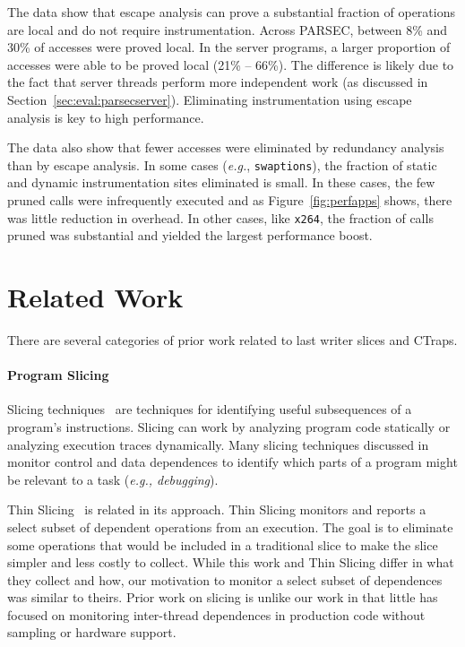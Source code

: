 \documentclass[preprint,9pt]{sigplanconf}
\newcommand{\ctraps}{CTraps\xspace}
\begin{document}
The data show that escape analysis can prove a substantial fraction of
operations are local and do not require instrumentation.  Across PARSEC,
between 8\% and 30\% of accesses were proved local.  In the server programs, a
larger proportion of accesses were able to be proved local (21\% -- 66\%).  The
difference is likely due to the fact that server threads perform more
independent work (as discussed in Section~\ref{sec:eval:parsecserver}).  Eliminating
instrumentation using escape analysis is key to high performance.  

The data also show that fewer accesses were eliminated by redundancy analysis
than by escape analysis.  In some cases ({\em e.g.}, {\tt swaptions}), the
fraction of static and dynamic instrumentation sites eliminated is small.  In
these cases, the few pruned calls were infrequently executed and as
Figure~\ref{fig:perfapps} shows, there was little reduction in overhead.  In
other cases, like {\tt x264}, the fraction of calls pruned was substantial 
and yielded the largest performance boost.




\section{Related Work}

There are several categories of prior work related to last writer slices and \ctraps.  

\paragraph{Program Slicing}
Slicing techniques~\cite{tipslicingsurvey} are techniques for
identifying useful subsequences of a program's instructions.   Slicing can work
by analyzing program code statically or analyzing execution traces dynamically.
Many slicing techniques discussed in ~\cite{tipslicingsurvey} monitor control and
data dependences to identify which parts of a program might be relevant to a
task ({\em e.g., debugging}).

Thin Slicing~\cite{thinslicing} is related in its approach. Thin
Slicing monitors and reports a select subset of dependent operations from an
execution.  The goal is to eliminate some operations that would be included in a traditional
slice to make the slice simpler and less costly to collect.  While this work and
Thin Slicing differ in what they collect and how, our motivation to monitor a
select subset of dependences was similar to theirs.    Prior work
on slicing is unlike our work in that little has focused on monitoring
inter-thread dependences in production code without sampling or hardware support.
\end{document}
